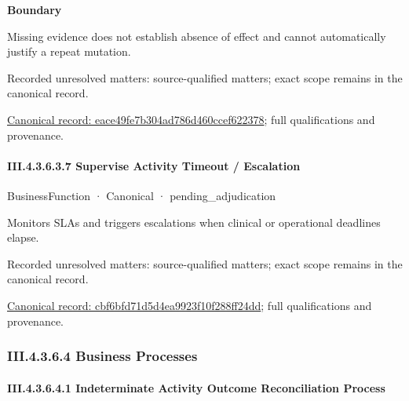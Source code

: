 \textbf{Boundary}



Missing evidence does not establish absence of effect and cannot automatically justify a repeat mutation.


{\small Recorded unresolved matters: source-qualified matters; exact scope remains in the canonical record.}\par
{\footnotesize \href{../../../../../../../continuum/business/business-function/eace49fe7b304ad786d460ccef622378.md}{Canonical record: eace49fe7b304ad786d460ccef622378}; full qualifications and provenance.}\par
\paragraph*{III.4.3.6.3.7 Supervise Activity Timeout / Escalation}
\label{navigation:III.4.3.6.3.7}

\label{element:cbf6bfd71d5d4ea9923f10f288ff24dd}
{\small BusinessFunction · Canonical · pending\_adjudication}\par

Monitors SLAs and triggers escalations when clinical or operational deadlines elapse.


{\small Recorded unresolved matters: source-qualified matters; exact scope remains in the canonical record.}\par
{\footnotesize \href{../../../../../../../continuum/business/business-function/cbf6bfd71d5d4ea9923f10f288ff24dd.md}{Canonical record: cbf6bfd71d5d4ea9923f10f288ff24dd}; full qualifications and provenance.}\par
\subsubsection*{III.4.3.6.4 Business Processes}
\label{navigation:III.4.3.6.4}

\paragraph*{III.4.3.6.4.1 Indeterminate Activity Outcome Reconciliation Process}
\label{navigation:III.4.3.6.4.1}

